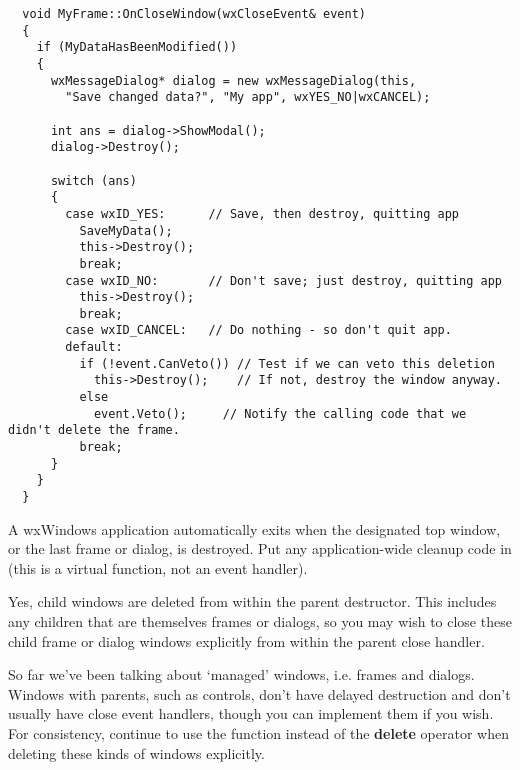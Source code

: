 {\small%
\begin{verbatim}
  void MyFrame::OnCloseWindow(wxCloseEvent& event)
  {
    if (MyDataHasBeenModified())
    {
      wxMessageDialog* dialog = new wxMessageDialog(this,
        "Save changed data?", "My app", wxYES_NO|wxCANCEL);

      int ans = dialog->ShowModal();
      dialog->Destroy();

      switch (ans)
      {
        case wxID_YES:      // Save, then destroy, quitting app
          SaveMyData();
          this->Destroy();
          break;
        case wxID_NO:       // Don't save; just destroy, quitting app
          this->Destroy();
          break;
        case wxID_CANCEL:   // Do nothing - so don't quit app.
        default:
          if (!event.CanVeto()) // Test if we can veto this deletion
            this->Destroy();    // If not, destroy the window anyway.
          else
            event.Veto();     // Notify the calling code that we didn't delete the frame.
          break;
      }
    }
  }
\end{verbatim}
}%


A wxWindows application automatically exits when the designated top window, or the
last frame or dialog, is destroyed. Put any application-wide cleanup code in  (this
is a virtual function, not an event handler).


Yes, child windows are deleted from within the parent destructor. This includes any children
that are themselves frames or dialogs, so you may wish to close these child frame or dialog windows
explicitly from within the parent close handler.


So far we've been talking about `managed' windows, i.e. frames and dialogs. Windows
with parents, such as controls, don't have delayed destruction and don't usually have
close event handlers, though you can implement them if you wish. For consistency,
continue to use the  function instead
of the {\bf delete} operator when deleting these kinds of windows explicitly.


